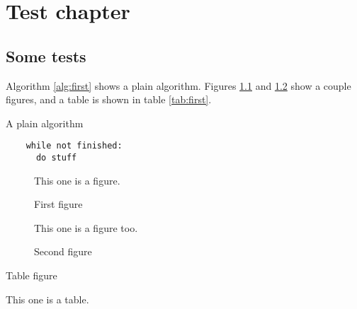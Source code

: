 \documentclass[english]{scrreprt}
\begin{document}
\begingroup
    \let\clearpage\relax
    \let\cleardoublepage\relax

    \tableofcontents
    \listoffigures
    \listoftables
\endgroup

\chapter{Test chapter}\label{ch:algotest}

\section{Some tests}

Algorithm \ref{alg:first} shows a plain algorithm. Figures \ref{fig:first} and \ref{fig:second} show a couple figures, and a table is shown in table \ref{tab:first}.

\begin{algorithm}
  \caption{A plain algorithm\label{alg:first}}
  \begin{verbatim}
    while not finished:
      do stuff
  \end{verbatim}
\end{algorithm}

\begin{figure}
  \caption{First figure\label{fig:first}}
  This one is a figure.
\end{figure}

\begin{figure}
  \caption{Second figure\label{fig:second}}
  This one is a figure too.
\end{figure}

\begin{table}
  \caption{Table figure\label{tab:first}}
  This one is a table.
\end{table}
\end{document}

